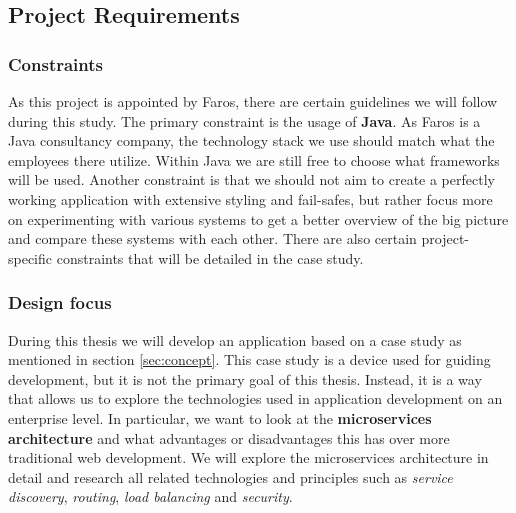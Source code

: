 \documentclass[12pt]{article}
\begin{document}
\begin{multicols}{2}
\subsection{Project Requirements}
\subsubsection{Constraints}\label{sec:constraints}
As this project is appointed by Faros, there are certain guidelines we will follow during this study. The primary constraint is the usage of \textbf{Java}. As Faros is a Java consultancy company, the technology stack we use should match what the employees there utilize. Within Java we are still free to choose what frameworks will be used. Another constraint is that we should not aim to create a perfectly working application with extensive styling and fail-safes, but rather focus more on experimenting with various systems to get a better overview of the big picture and compare these systems with each other. There are also certain project-specific constraints that will be detailed in the case study.
\subsubsection{Design focus}
During this thesis we will develop an application based on a case study as mentioned in section \ref{sec:concept}. This case study is a device used for guiding development, but it is not the primary goal of this thesis. Instead, it is a way that allows us to explore the technologies used in application development on an enterprise level. In particular, we want to look at the \textbf{microservices architecture} and what advantages or disadvantages this has over more traditional web development. We will explore the microservices architecture in detail and research all related technologies and principles such as \textit{service discovery}, \textit{routing}, \textit{load balancing} and \textit{security}.

\end{multicols}

\end{document}
